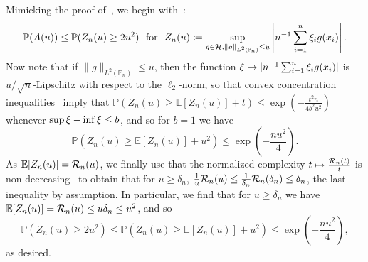 \documentclass[11pt]{article}
\newcommand{\E}{\mathbb{E}}
\newcommand{\Prb}{\mathbb{P}}
\renewcommand{\P}{\mathbb{P}}
\newcommand{\mc}[1]{\mathcal{#1}}
\newcommand{\norms}[1]{\|{#1}\|} %
\newcommand{\<}{\langle} %
\renewcommand{\>}{\rangle}
\newcommand{\defeq}{\coloneqq}
\newcommand{\LtwoPns}[1]{\norms{#1}_{L^2(\Prb_n)}}
\begin{document}
Mimicking the proof of~\cite[Lemma 13.12]{Wainwright19}, we
begin with~\cite[Eq.~(13.40)]{Wainwright19}:
\begin{equation*}
  \P(A(u))
  \le \P(Z_n(u) \ge 2 u^2)
  ~~ \mbox{for} ~~
  Z_n(u) \defeq \sup_{g \in \mc{H},
    \LtwoPns{g} \le u} \left|n^{-1} \sum_{i=1}^n \noise_i g(x_i)\right|.
\end{equation*}
Now note that if $\LtwoPns{g} \le u$, then the function $\xi \mapsto
|n^{-1} \sum_{i = 1}^n \xi_i g(x_i)|$ is $u / \sqrt{n}$-Lipschitz
with respect to the $\ell_2$-norm, so that convex concentration
inequalities~\cite[e.g.][Theorem 3.4]{Wainwright19}
imply that
$\P(Z_n(u) \ge \E[Z_n(u)] + t)
\le \exp(-\frac{t^2 n}{4 b^2 u^2})$
whenever $\sup \xi - \inf \xi \le b$, and so
for $b = 1$ we have
\begin{equation*}
  \P(Z_n(u) \ge \E[Z_n(u)] + u^2) \le
  \exp\left(-\frac{n u^2}{4}\right).
\end{equation*}
As $\E[Z_n(u)] = \localcomplexity_n(u)$, we
finally use that the normalized complexity $t \mapsto
\frac{\localcomplexity_n(t)}{t}$ is non-decreasing~\cite[Lemma
  13.6]{Wainwright19} to obtain that
for $u \ge \delta_n$,
$\frac{1}{u} \localcomplexity_n(u)
\le \frac{1}{\delta_n} \localcomplexity_n(\delta_n)
\le \delta_n$, the last inequality by assumption.
In particular, we find that for $u \ge \delta_n$ we have
$\E[Z_n(u)] = \localcomplexity_n(u)
\le u \delta_n \le u^2$, and so
\begin{equation*}
  \P(Z_n(u) \ge 2 u^2) \le
  \P(Z_n(u) \ge \E[Z_n(u)] + u^2)
  \le \exp\left(-\frac{n u^2}{4} \right),
\end{equation*}
as desired.
\end{document}

